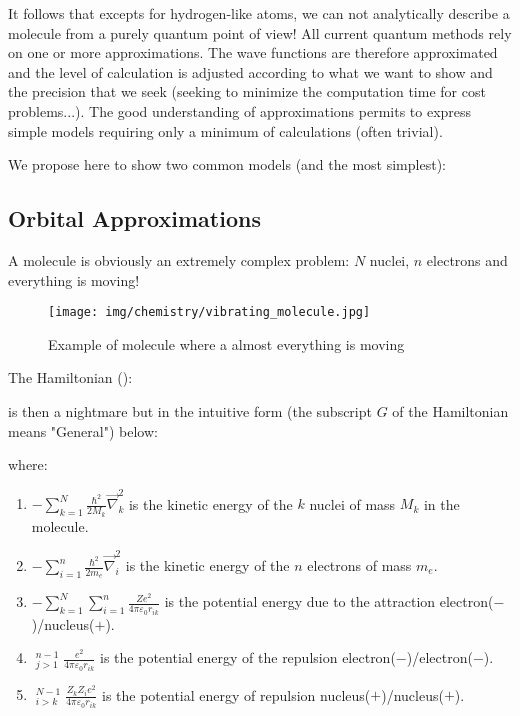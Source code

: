 	It follows that excepts for hydrogen-like atoms, we can not analytically describe a molecule from a purely quantum point of view! All current quantum methods rely on one or more approximations. The wave functions are therefore approximated and the level of calculation is adjusted according to what we want to show and the precision that we seek (seeking to minimize the computation time for cost problems...). The good understanding of approximations permits to express simple models requiring only a minimum of calculations (often trivial).
	
	We propose here to show two common models (and the most simplest):
	
	\subsection{Orbital Approximations}
	A molecule is obviously an extremely complex problem: $N$ nuclei, $n$ electrons and everything is moving!
	\begin{figure}[H]
		\begin{center}
		\texttt{[image: img/chemistry/vibrating\_molecule.jpg]}
		\end{center}	
		\caption{Example of molecule where a almost everything is moving}
	\end{figure}
	The Hamiltonian ():
	
	is then a nightmare but in the intuitive form (the subscript $G$ of the Hamiltonian means "General") below:
	
	where:
	
	\begin{enumerate}
		\item $\displaystyle-\sum_{k=1}^{N}\frac{\hbar^2}{2M_k}\vec{\nabla}_k^2$ is the kinetic energy of the $k$ nuclei of mass $M_k$ in the molecule.

		\item $\displaystyle-\sum_{i=1}^{n}\frac{\hbar^2}{2m_e}\vec{\nabla}_i^2$  is the kinetic energy of the $n$ electrons of mass $m_e$.

		\item $\displaystyle-\sum_{k=1}^{N}\sum_{i=1}^{n}\frac{Ze^2}{4\pi\varepsilon_0 r_{ik}}$ is the potential energy due to the attraction electron($-$)/nucleus($+$).

		\item $\displaystyle\mathop{\sum_{i=1}}_{j>1}^{n-1}\frac{e^2}{4\pi\varepsilon_0 r_{ik}}$ is the potential energy of the repulsion electron($-$)/electron($-$).

		\item $\displaystyle\mathop{\sum_{k=1}}_{i>k}^{N-1}\frac{Z_kZ_ie^2}{4\pi\varepsilon_0 r_{ik}}$ is the potential energy of repulsion nucleus($+$)/nucleus($+$).
	\end{enumerate}

